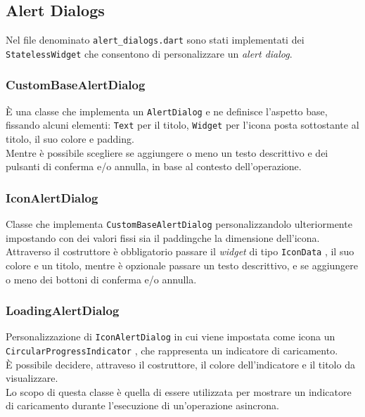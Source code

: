 \subsection{Alert Dialogs}
\label{subsec:alert-dialogs}

Nel file denominato \lstinline{alert_dialogs.dart} sono stati implementati dei \lstinline{StatelessWidget} che consentono di personalizzare un \emph{alert dialog}.

\subsubsection*{CustomBaseAlertDialog}
\label{subsubsec:custom-base-alert-dialog}

È una classe che implementa un \lstinline{AlertDialog} \cite{site:alert-dialog} e ne definisce l'aspetto base, fissando alcuni elementi: \lstinline{Text} \cite{site:text} per il titolo, \lstinline{Widget} per l'icona posta sottostante al titolo, il suo colore e \gls{padding}\glsoccur.\\
Mentre è possibile scegliere se aggiungere o meno un testo descrittivo e dei pulsanti di conferma e/o annulla, in base al contesto dell'operazione.

\subsubsection*{IconAlertDialog}
\label{subsubsec:icon-alert-dialog}

Classe che implementa \lstinline{CustomBaseAlertDialog} personalizzandolo ulteriormente impostando con dei valori fissi sia il \gls{padding}\glsoccur che la dimensione dell'icona.\\
Attraverso il costruttore è obbligatorio passare il \emph{widget} di tipo \lstinline{IconData} \cite{site:icon-data}, il suo colore e un titolo, mentre è opzionale passare un testo descrittivo, e se aggiungere o meno dei bottoni di conferma e/o annulla.

\subsubsection*{LoadingAlertDialog}
\label{subsubsec:loading-alert-dialog}

Personalizzazione di \lstinline{IconAlertDialog} in cui viene impostata come icona un \lstinline{CircularProgressIndicator} \cite{site:circular-progress-indicator}, che rappresenta un indicatore di caricamento.\\
È possibile decidere, attraveso il costruttore, il colore dell'indicatore e il titolo da visualizzare.\\
Lo scopo di questa classe è quella di essere utilizzata per mostrare un indicatore di caricamento durante l'esecuzione di un'operazione asincrona.

